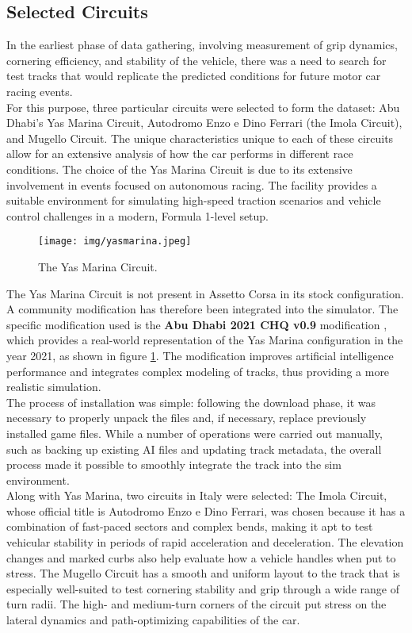 \documentclass[a4paper,final,12pt]{report}
\begin{document}
\subsection{Selected Circuits}
In the earliest phase of data gathering, involving measurement of grip dynamics, cornering efficiency, and stability of the vehicle, there was a need to search for test tracks that would replicate the predicted conditions for future motor car racing events.\\

For this purpose, three particular circuits were selected to form the dataset: Abu Dhabi's Yas Marina Circuit, Autodromo Enzo e Dino Ferrari (the Imola Circuit), and Mugello Circuit. The unique characteristics unique to each of these circuits allow for an extensive analysis of how the car performs in different race conditions. The choice of the Yas Marina Circuit is due to its extensive involvement in events focused on autonomous racing. The facility provides a suitable environment for simulating high-speed traction scenarios and vehicle control challenges in a modern, Formula 1-level setup.

\begin{figure}[hbtp]
\centering
\texttt{[image: img/yasmarina.jpeg]}
\caption{The Yas Marina Circuit.}
\label{figura:yasmarina}
\end{figure}

The Yas Marina Circuit is not present in Assetto Corsa in its stock configuration. A community modification has therefore been integrated into the simulator. The specific modification used is the \textbf{Abu Dhabi 2021 CHQ v0.9} modification \cite{yasmarinachq2021}, which provides a real-world representation of the Yas Marina configuration in the year 2021, as shown in figure \ref{figura:yasmarina}. The modification improves artificial intelligence performance and integrates complex modeling of tracks, thus providing a more realistic simulation.\\

The process of installation was simple: following the download phase, it was necessary to properly unpack the files and, if necessary, replace previously installed game files. While a number of operations were carried out manually, such as backing up existing AI files and updating track metadata, the overall process made it possible to smoothly integrate the track into the sim environment.
\\

Along with Yas Marina, two circuits in Italy were selected: The Imola Circuit, whose official title is Autodromo Enzo e Dino Ferrari, was chosen because it has a combination of fast-paced sectors and complex bends, making it apt to test vehicular stability in periods of rapid acceleration and deceleration. The elevation changes and marked curbs also help evaluate how a vehicle handles when put to stress. The Mugello Circuit has a smooth and uniform layout to the track that is especially well-suited to test cornering stability and grip through a wide range of turn radii. The high- and medium-turn corners of the circuit put stress on the lateral dynamics and path-optimizing capabilities of the car.
\end{document}
